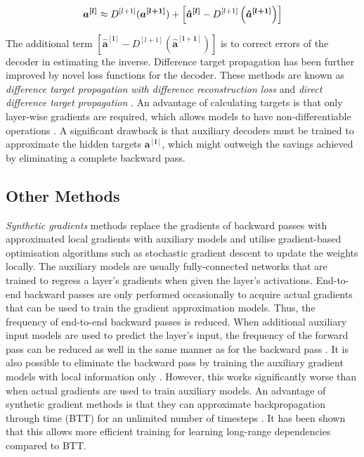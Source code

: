 \begin{align}\eqlbl{tp6}
	\boldsymbol{a^{[l]}} \approx D^{[l+1]}(\boldsymbol{a^{[l+1]}}) + \left[ \boldsymbol{\hat{a}^{[l]}} - D^{[l+1]}\left( \boldsymbol{\hat{a}^{[l+1]}} \right) \right]
\end{align}

The additional term $\left[ \boldsymbol{\hat{a}^{[l]}} - D^{[l+1]}\left(\boldsymbol{\hat{a}^{[l+1]}} \right) \right]$ is to correct errors of the decoder in estimating the inverse.
Difference target propagation has been further improved by novel loss functions for the decoder.
These methods are known as \emph{difference target propagation with difference reconstruction loss} and \emph{direct difference target propagation} .
An advantage of calculating targets is that only layer-wise gradients are required, which allows models to have non-differentiable operations \cite{Lee_Zhang_Fischer_Bengio_2015}.
A significant drawback is that auxiliary decoders must be trained to approximate the hidden targets $\boldsymbol{a^{[l]}}$, which might outweigh the savings achieved by eliminating a complete backward pass.

\subsection{Other Methods}
\emph{Synthetic gradients} methods  replace the gradients of backward passes with approximated local gradients with auxiliary models and utilise gradient-based optimisation algorithms such as stochastic gradient descent to update the weights locally.
The auxiliary models are usually fully-connected networks that are trained to regress a layer's gradients when given the layer's activations.
End-to-end backward passes are only performed occasionally to acquire actual gradients that can be used to train the gradient approximation models.
Thus, the frequency of end-to-end backward passes is reduced.
When additional auxiliary input models are used to predict the layer's input, the frequency of the forward pass can be reduced as well in the same manner as for the backward pass \cite{pmlr-v70-jaderberg17a}.
It is also possible to eliminate the backward pass by training the auxiliary gradient models with local information only .
However, this works significantly worse than when actual gradients are used to train auxiliary models.
An advantage of synthetic gradient methods is that they can approximate backpropagation through time (BTT) for an unlimited number of timesteps \cite{pmlr-v70-jaderberg17a}.
It has been shown that this allows more efficient training for learning long-range dependencies compared to BTT.

